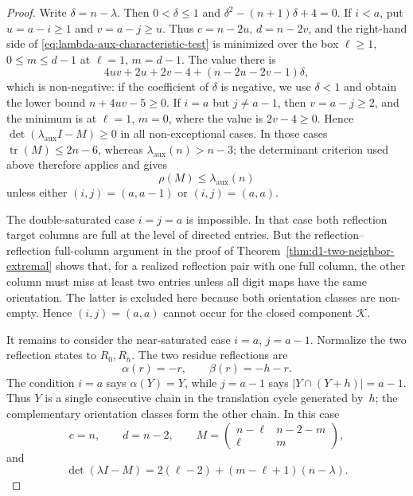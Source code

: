 \documentclass{amsart}
\theoremstyle{definition}
\theoremstyle{remark}
\begin{document}
\begin{proof}
Write \(\delta=n-\lambda\).  Then \(0<\delta\le1\) and
\(\delta^2-(n+1)\delta+4=0\).  If \(i<a\), put \(u=a-i\ge1\) and
\(v=a-j\ge u\).  Thus \(c=n-2u\), \(d=n-2v\), and the right-hand side
of \eqref{eq:lambda-aux-characteristic-test} is minimized over the box
\(\ell\ge1\), \(0\le m\le d-1\) at \(\ell=1\), \(m=d-1\).  The value
there is
\[
  4uv+2u+2v-4+(n-2u-2v-1)\delta,
\]
which is non-negative: if the coefficient of \(\delta\) is negative, we
use \(\delta<1\) and obtain the lower bound \(n+4uv-5\ge0\).  If
\(i=a\) but \(j\ne a-1\), then \(v=a-j\ge2\), and the minimum is at
\(\ell=1\), \(m=0\), where the value is \(2v-4\ge0\).  Hence
\(\det(\lambda_{\mathrm{aux}} I-M)\ge0\) in all non-exceptional cases.
In those cases \(\operatorname{tr}(M)\le2n-6\), whereas
\(\lambda_{\mathrm{aux}}(n)>n-3\); the determinant criterion used above
therefore applies and gives
\[
  \rho(M)\le\lambda_{\mathrm{aux}}(n)
\]
unless either \((i,j)=(a,a-1)\) or \((i,j)=(a,a)\).

The double-saturated case \(i=j=a\) is impossible.  In that case both
reflection target columns are full at the level of directed entries.
But the reflection--reflection full-column argument in the proof of
Theorem~\ref{thm:d1-two-neighbor-extremal} shows that, for a realized
reflection pair with one full column, the other column must miss at
least two entries unless all digit maps have the same orientation.  The
latter is excluded here because both orientation classes are non-empty.
Hence \((i,j)=(a,a)\) cannot occur for the closed component
\(\mathcal K\).

It remains to consider the near-saturated case \(i=a\), \(j=a-1\).
Normalize the two reflection states to \(R_0,R_h\).  The two residue
reflections are
\[
  \alpha(r)=-r,
  \qquad
  \beta(r)=-h-r.
\]
The condition \(i=a\) says \(\alpha(Y)=Y\), while \(j=a-1\) says
\(|Y\cap(Y+h)|=a-1\).  Thus \(Y\) is a single consecutive chain in the
translation cycle generated by~\(h\); the complementary orientation
classes form the other chain.  In this case
\[
  c=n,
  \qquad d=n-2,
  \qquad
  M=\begin{pmatrix}n-\ell&n-2-m\\ \ell&m\end{pmatrix},
\]
and
\begin{equation}\label{eq:near-saturated-lambda-aux-test}
  \det(\lambda I-M)
  =2(\ell-2)+(m-\ell+1)(n-\lambda).
\end{equation}


\end{proof}
\end{document}
